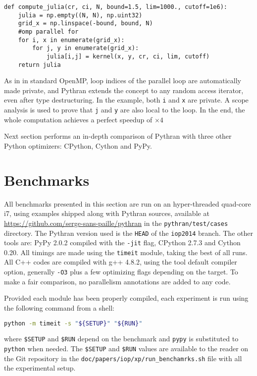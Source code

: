 \documentclass[10pt, onecolumn, preprint]{sigplanconf}
\begin{document}
\begin{lstlisting}
def compute_julia(cr, ci, N, bound=1.5, lim=1000., cutoff=1e6):
    julia = np.empty((N, N), np.uint32)
    grid_x = np.linspace(-bound, bound, N)
    #omp parallel for 
    for i, x in enumerate(grid_x):
        for j, y in enumerate(grid_x):
            julia[i,j] = kernel(x, y, cr, ci, lim, cutoff)
    return julia
\end{lstlisting}

As in in standard OpenMP, loop indices of the parallel loop are automatically
made private, and Pythran extends the concept to any random access iterator,
even after type destructuring. In the example, both \texttt{i} and \texttt{x}
are private. A scope analysis is used to prove that \texttt{j} and \texttt{y}
are also local to the loop. In the end, the whole computation achieves a
perfect speedup of $\times4$

Next section performs an in-depth comparison of Pythran with three other Python
optimizers: CPython, Cython and PyPy.

\section{Benchmarks}
\label{sec:benchmarks}


All benchmarks presented in this section are run on an hyper-threaded quad-core
i7, %
using examples shipped along with
Pythran sources, available at \url{https://github.com/serge-sans-paille/pythran} in
the \texttt{pythran/test/cases} directory. The Pythran version used is the
\texttt{HEAD} of the \texttt{iop2014} branch. The other tools are: PyPy 2.0.2 compiled with the
\texttt{-jit} flag, CPython 2.7.3 and Cython 0.20. All timings are made using
the \texttt{timeit} module, taking the best of all runs. All C++ codes are
compiled with g++ 4.8.2, using the tool default compiler option, generally
\texttt{-O3} plus a few optimizing flags depending on the target. To make a
fair comparison, no parallelism annotations are added to any code.

Provided each module has been properly compiled, each experiment is run using
the following command from a shell:

\begin{lstlisting}[language=sh]
python -m timeit -s "${SETUP}" "${RUN}"
\end{lstlisting}

\noindent where \texttt{\$SETUP} and \texttt{\$RUN} depend on the benchmark and
\texttt{pypy} is substituted to \texttt{python} when needed. The
\texttt{\$SETUP} and \texttt{\$RUN} values are available to the reader on the
Git repository in the \texttt{doc/papers/iop/xp/run\_benchamrks.sh} file with
all the experimental setup.
\end{document}
